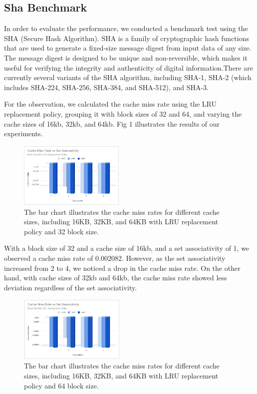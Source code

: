 \documentclass[conference]{IEEEtran}
\begin{document}
\subsection{Sha Benchmark}
In order to evaluate the performance, we conducted a benchmark test using the SHA (Secure Hash Algorithm). SHA is a family of cryptographic hash functions that are used to generate a fixed-size message digest from input data of any size. The message digest is designed to be unique and non-reversible, which makes it useful for verifying the integrity and authenticity of digital information.There are currently several variants of the SHA algorithm, including SHA-1, SHA-2 (which includes SHA-224, SHA-256, SHA-384, and SHA-512), and SHA-3.

For the observation, we calculated the cache miss rate using the LRU replacement policy, grouping it with block sizes of 32 and 64, and varying the cache sizes of 16kb, 32kb, and 64kb. Fig 1 illustrates the results of our experiments.

\begin{figure}[H]
    \centering
    \includegraphics[width=0.45\textwidth]{sha/sha_cache_vs_setAssocBL32.png}
    \caption{The bar chart illustrates the cache miss rates for different cache sizes, including 16KB, 32KB, and 64KB with LRU replacement policy and 32 block size.}
\end{figure}

With a block size of 32 and a cache size of 16kb, and a set associativity of 1, we observed a cache miss rate of 0.002082. However, as the set associativity increased from 2 to 4, we noticed a drop in the cache miss rate. On the other hand, with cache sizes of 32kb and 64kb, the cache miss rate showed less deviation regardless of the set associativity.

\begin{figure}[H]
    \centering
    \includegraphics[width=0.45\textwidth]{sha/sha_cache_vs_setAssocBL64.png}
    \caption{The bar chart illustrates the cache miss rates for different cache sizes, including 16KB, 32KB, and 64KB with LRU replacement policy and 64 block size.}
\end{figure}
\end{document}
